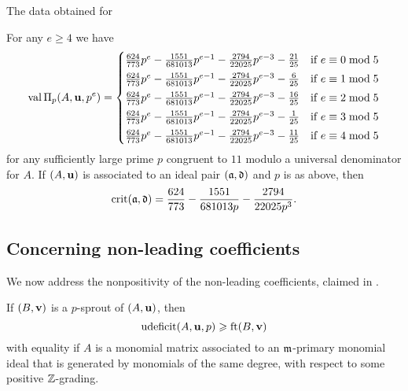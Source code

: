 \documentclass{amsart}
\begin{document}
\begin{example}
\begin{table}
\begin{center}
      \end{center}
      \caption{The data obtained for }
      \label{table: new example data}
   \end{table}
   For any $e\ge 4$ we have
   \[
      \operatorname{val}\Pi_p(A,\mathbf{u},p^e) =
      \begin{cases}
         \frac{624}{773}p^{e} - \frac{1551}{681013}p^{e-1} - \frac{2794}{22025}p^{e-3} - \frac{21}{25} & \text{if $e \equiv 0 \bmod 5$}\\[1mm]
         \frac{624}{773}p^{e} - \frac{1551}{681013}p^{e-1} - \frac{2794}{22025}p^{e-3} - \frac{6}{25} & \text{if $e \equiv 1 \bmod 5$}\\[1mm]
         \frac{624}{773}p^{e} - \frac{1551}{681013}p^{e-1} - \frac{2794}{22025}p^{e-3} - \frac{16}{25} & \text{if $e \equiv 2 \bmod 5$}\\[1mm]
         \frac{624}{773}p^{e} - \frac{1551}{681013}p^{e-1} - \frac{2794}{22025}p^{e-3} - \frac{1}{25} & \text{if $e \equiv 3 \bmod 5$}\\[1mm]
         \frac{624}{773}p^{e} - \frac{1551}{681013}p^{e-1} - \frac{2794}{22025}p^{e-3} - \frac{11}{25} & \text{if $e \equiv 4 \bmod 5$}
      \end{cases}
   \]
   for any sufficiently large prime $p$ congruent to $11$ modulo a universal denominator for $A$.
   If $(A,\mathbf{u})$ is associated to an ideal pair $(\mathfrak{a},\mathfrak{d})$ and $p$ is as above, then
   \[\operatorname{crit}(\mathfrak{a},\mathfrak{d}) = \frac{624}{773} - \frac{1551}{681013 p} - \frac{2794}{22025 p^3}.\]
\end{example}

\subsection{Concerning non-leading coefficients}

We now address the nonpositivity of the non-leading coefficients, claimed in .

\begin{lemma}
   \label{non-leading coefficients: L}
   If $(B, \mathbf{v})$ is a $p$-sprout of $(A, \mathbf{u})$, then
   \[
      \operatorname{udeficit}(A, \mathbf{u}, p) \geqslant \operatorname{ft}(B, \mathbf{v})
   \]
   with equality if $A$ is a monomial matrix associated to an $\mathfrak{m}$-primary monomial ideal that is generated by monomials of the same degree, with respect to some positive $\mathbb{Z}$-grading.
\end{lemma}
\end{document}
